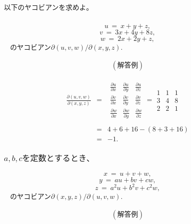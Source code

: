 \documentclass[a4paper,11pt,fleqn]{jarticle}
\begin{document}
\newpage
\subsection{}
以下のヤコビアンを求めよ。
\subsubsection{}
$$u ~=~ x+y+z,$$
$$v ~=~ 3x+4y+8z,$$
$$w ~=~ 2x+2y+z,$$
$~~~~$のヤコビアン$\partial (u,v,w)/\partial (x,y,z)$.

\begin{eqnarray*}
(解答例)
\end{eqnarray*}

\begin{eqnarray*}
\frac{\partial (u, v, w)}{\partial (x, y, z)}&=& 
\begin{array}{|ccc|}
\frac{\partial u}{\partial x} & \frac{\partial u}{\partial y} & \frac{\partial u}{\partial z} \\
\frac{\partial v}{\partial x} & \frac{\partial v}{\partial y} & \frac{\partial v}{\partial z} \\
\frac{\partial w}{\partial x} & \frac{\partial w}{\partial y} & \frac{\partial w}{\partial z}
\end{array}
=
\begin{array}{|ccc|}
1&1&1\\
3&4&8\\
2&2&1
\end{array}
\\
&&\\
&=&4+6+16-(8+3+16)\\
&=&-1.
\end{eqnarray*}

\newpage
\subsubsection{$a,b,cを定数とするとき、$}
$$x~=~u+v+w,$$
$$y~=~au+bv+cw,$$
$$z~=~a^2u+b^2v+c^2w,$$
$~~~~$のヤコビアン$\partial (x,y,z)/\partial (u,v,w)$.

\begin{eqnarray*}
(解答例)
\end{eqnarray*}
\end{document}

